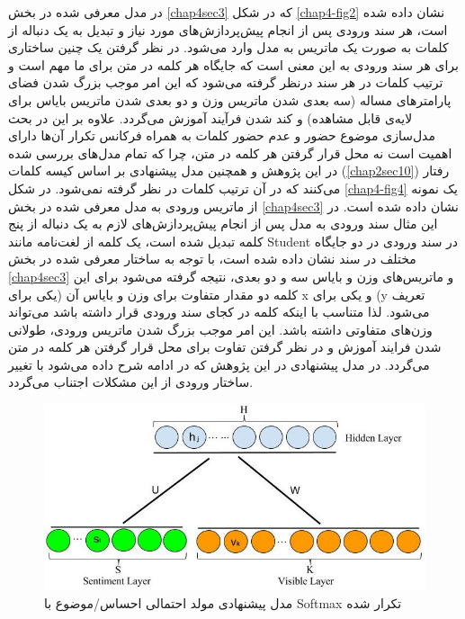 در مدل معرفی‌ شده در بخش
\ref{chap4sec3}
که در شکل
\ref{chap4-fig2}
نشان داده شده است، هر سند ورودی پس از انجام پیش‌پردازش‌های مورد نیاز و تبدیل به یک دنباله از کلمات به صورت یک ماتریس به مدل وارد می‌‌شود. در نظر گرفتن یک چنین ساختاری برای هر سند ورودی به این معنی‌ است که جایگاه هر کلمه در متن برای ما مهم است و ترتیب کلمات در هر سند درنظر گرفته می‌‌شود که این امر موجب بزرگ شدن فضای پارامتر‌های مساله (سه‌ بعدی شدن ماتریس وزن و دو بعدی شدن ماتریس بایاس برای لایه‌ی قابل مشاهده) و کند شدن فرآیند آموزش می‌‌گردد. علاوه بر این در بحث مدل‌سازی موضوع حضور و عدم حضور کلمات به همراه فرکانس تکرار آن‌ها دارای اهمیت است نه محل قرار گرفتن هر کلمه در متن، چرا که تمام مدل‌های بررسی‌ شده در این پژوهش و همچنین مدل پیشنهادی بر اساس کیسه کلمات
(\ref{chap2sec10})
رفتار می‌‌کنند که در آن ترتیب کلمات در نظر گرفته نمی‌‌شود.  در شکل
\ref{chap4-fig4}
یک نمونه از ماتریس ورودی به مدل معرفی‌ شده در بخش
\ref{chap4sec3}
نشان داده شده است. در این مثال سند ورودی به مدل پس از انجام پیش‌پردازش‌های لازم به یک دنباله از پنج کلمه تبدیل شده است، یک کلمه از لغت‌نامه  مانند 
Student
در سند ورودی در دو جایگاه مختلف در سند نشان داده شده است، با توجه به ساختار معرفی‌ شده در بخش
\ref{chap4sec3}
و ماتریس‌های وزن و بایاس سه‌ و دو بعدی، نتیجه گرفته می‌‌شود برای این کلمه دو مقدار متفاوت برای وزن و بایاس آن (یکی برای x
 و یکی برای 
 (y
 تعریف می‌‌شود. لذا متناسب با اینکه کلمه در کجای سند ورودی قرار داشته باشد می‌تواند وزن‌های متفاوتی داشته باشد. این امر موجب بزرگ شدن ماتریس ورودی،  طولانی‌ شدن فرایند آموزش و در نظر گرفتن تفاوت برای محل قرار گرفتن هر کلمه در متن می‌گردد. در مدل پیشنهادی در این پژوهش که در ادامه شرح داده می‌‌شود با تغییر ساختار ورودی از این مشکلات اجتناب می‌‌گردد.

\begin{figure}[!t]
	\centering
	\includegraphics[scale=0.5]{chap4-img/SRS}
	\caption{مدل پیشنهادی مولد احتمالی احساس/موضوع با Softmax تکرار شده}
	\label{chap4-fig3}
\end{figure}

